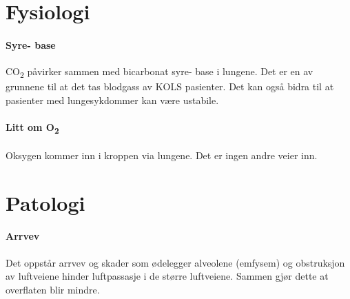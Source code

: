 		\section{Fysiologi}
				\paragraph{Syre- base\\}
					CO\textsubscript{2} påvirker sammen med bicarbonat syre- base i lungene. Det er en av grunnene til at det tas blodgass av KOLS pasienter. Det kan også bidra til at pasienter med lungesykdommer kan være ustabile.
				\paragraph{Litt om O\textsubscript{2}\\}
					Oksygen kommer inn i kroppen via lungene. Det er ingen andre veier inn. 
		\section{Patologi}
			\paragraph{Arrvev\\}
				Det oppstår arrvev og skader som ødelegger alveolene (emfysem) og obstruksjon av luftveiene hinder luftpassasje i de større luftveiene. Sammen gjør dette at overflaten blir mindre.
